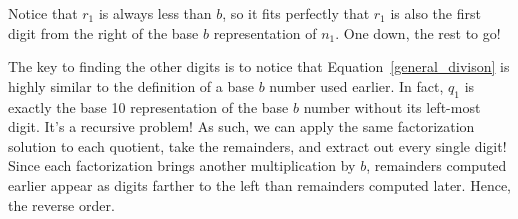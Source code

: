 \documentclass{pset_template}
\begin{document}
Notice that $r_1$ is always less than $b$, so it fits perfectly that $r_1$ is also the first digit from
 the right of the base $b$ representation of $n_1$.  
One down, the rest to go!

The key to finding the other digits is to notice that Equation~\ref{general_divison} is highly similar
to the definition of a base $b$ number used earlier. 
In fact, $q_1$ is exactly the base 10 representation of the base $b$ number without its left-most digit.
It's a recursive problem!
As such, we can apply the same factorization solution to each quotient, take the remainders, and extract out every single digit! 
Since each factorization brings another multiplication by $b$, remainders computed earlier appear as
digits farther to the left than remainders computed later. Hence, the reverse order.
\end{document}
